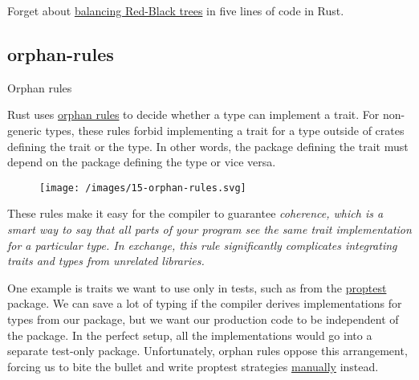 \documentclass{article}
\begin{document}
Forget about \href{https://www.cs.tufts.edu/comp/150FP/archive/chris-okasaki/redblack99.pdf}{balancing Red-Black trees} in five lines of code in Rust.

\subsection{orphan-rules}{Orphan rules}

Rust uses \href{https://doc.rust-lang.org/reference/items/implementations.html?highlight=orphan#orphan-rules}{orphan rules} to decide whether a type can implement a trait.
For non-generic types, these rules forbid implementing a trait for a type outside of crates defining the trait or the type.
In other words, the package defining the trait must depend on the package defining the type or vice versa.

\begin{figure}[grayscale-diagram]
\texttt{[image: /images/15-orphan-rules.svg]}
\end{figure}

These rules make it easy for the compiler to guarantee \em{coherence}, which is a smart way to say that all parts of your program see the same trait implementation for a particular type.
In exchange, this rule significantly complicates integrating traits and types from unrelated libraries.

One example is traits we want to use only in tests, such as \href{https://altsysrq.github.io/rustdoc/proptest/1.0.0/proptest/arbitrary/trait.Arbitrary.html}{} from the \href{https://crates.io/crates/proptest}{proptest} package.
We can save a lot of typing if the compiler derives implementations for types from our package, but we want our production code to be independent of the  package.
In the perfect setup, all the  implementations would go into a separate test-only package.
Unfortunately, orphan rules oppose this arrangement, forcing us to bite the bullet and write proptest strategies \href{https://altsysrq.github.io/proptest-book/proptest/tutorial/macro-prop-compose.html}{manually} instead.
\end{document}
